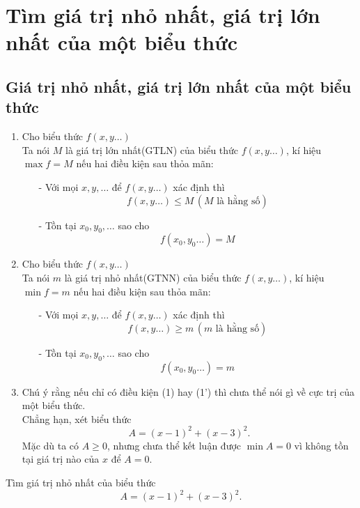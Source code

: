 \section{Tìm giá trị nhỏ nhất, giá trị lớn nhất của một biểu thức}
\subsection{Giá trị nhỏ nhất, giá trị lớn nhất của một biểu thức}
\begin{enumerate}[1.]
	\item Cho biểu thức $ f(x,y\ldots) $\\
	Ta nói $ M $ là giá trị lớn nhất(GTLN) của biểu thức $ f(x,y\ldots) $, kí hiệu $ \max f=M $ nếu hai điều kiện sau thỏa mãn:
	\begin{itemize}
		\item[-] Với mọi $ x,y,\ldots $ để  $ f(x,y\ldots) $ xác định thì \[f(x,y\ldots)\le M\,(M\text{ là hằng số})\tag{1}\]
		\item[-] Tồn tại $ x_0,y_0,\ldots $ sao cho \[f(x_0,y_0\ldots)=M\tag{2}\]
	\end{itemize}
	\item Cho biểu thức $ f(x,y\ldots) $\\
	Ta nói $ m $ là giá trị nhỏ nhất(GTNN) của biểu thức $ f(x,y\ldots) $, kí hiệu $ \min f=m $ nếu hai điều kiện sau thỏa mãn:
	\begin{itemize}
		\item[-] Với mọi $ x,y,\ldots $ để  $ f(x,y\ldots) $ xác định thì \[f(x,y\ldots)\ge m\,(m\text{ là hằng số})\tag{1'}\]
		\item[-] Tồn tại $ x_0,y_0,\ldots $ sao cho \[f(x_0,y_0\ldots)=m\tag{2'}\]
	\end{itemize}
	\item Chú ý rằng nếu chỉ có điều kiện (1) hay (1')
 thì chưa thể nói gì về cực trị của một biểu thức.\\
 Chẳng hạn, xét biểu thức \[A=(x-1)^2+(x-3)^2.\]
 Mặc dù ta có $A\ge 0$, nhưng chưa thể kết luận được $\min A=0$ vì không tồn tại giá trị nào của $x$ để $A=0$.
 \end{enumerate}
\begin{vd}%
	\label{103}
Tìm giá trị nhỏ nhất của biểu thức $$A=(x-1)^2+(x-3)^2.$$
\end{vd}
